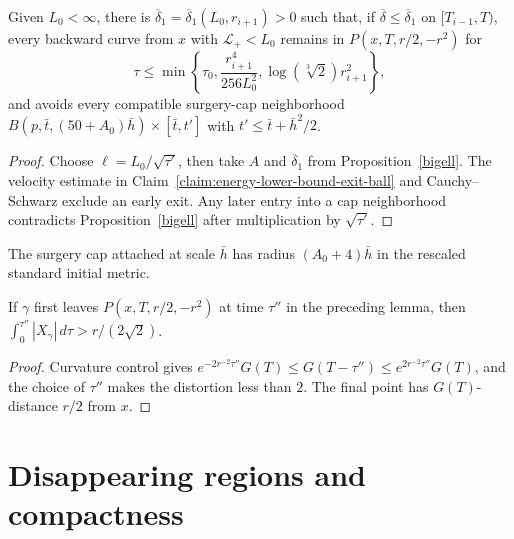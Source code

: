 \begin{lemma}
\label{lem:small-L-plus-avoids-surgery-caps}
\label{L_0}
Given $L_0<\infty$, there is $\overline\delta_1=\overline\delta_1(L_0,r_{i+1})>0$ such that, if $\overline\delta\leq\overline\delta_1$ on $[T_{i-1},T)$, every backward curve from $x$ with $\mathcal L_+<L_0$ remains in $P(x,T,r/2,-r^2)$ for
\[
\tau\leq\min\left\{\tau_0,\frac{r_{i+1}^4}{256L_0^2},\log(\sqrt[3]2)r_{i+1}^2\right\},
\]
and avoids every compatible surgery-cap neighborhood $B(p,\bar t,(50+A_0)\bar h)\times[\bar t,t']$ with $t'\leq\bar t+\bar h^2/2$.
\end{lemma}
\label{tau_1est}
\begin{proof}
\sketch
{}
Choose $\ell=L_0/\sqrt{\tau'}$, then take $A$ and $\overline\delta_1$ from Proposition~\ref{bigell}. The velocity estimate in Claim~\ref{claim:energy-lower-bound-exit-ball} and Cauchy--Schwarz exclude an early exit. Any later entry into a cap neighborhood contradicts Proposition~\ref{bigell} after multiplication by $\sqrt{\tau'}$.
\end{proof}

\begin{remark}
\label{rem:surgery-cap-radius-recollection}
The surgery cap attached at scale $\bar h$ has radius $(A_0+4)\bar h$ in the rescaled standard initial metric.
\end{remark}

\begin{claim}
\label{claim:energy-lower-bound-exit-ball}
If $\gamma$ first leaves $P(x,T,r/2,-r^2)$ at time $\tau''$ in the preceding lemma, then $\int_0^{\tau''}|X_\gamma|\,d\tau>r/(2\sqrt2)$.
\end{claim}
\begin{proof}
\sketch Curvature control gives $e^{-2r^{-2}\tau''}G(T)\leq G(T-\tau'')\leq e^{2r^{-2}\tau''}G(T)$, and the choice of $\tau''$ makes the distortion less than $2$. The final point has $G(T)$-distance $r/2$ from $x$.
\end{proof}

\section{Disappearing regions and compactness}

